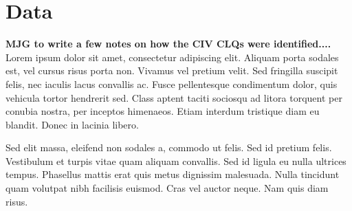 \documentclass[a4paper,fleqn,usenatbib]{mnras}
\begin{document}
\section{Data}
{\bf MJG to write a few notes on how the CIV CLQs were identified....}
 Lorem ipsum dolor sit amet, consectetur adipiscing elit. Aliquam
porta sodales est, vel cursus risus porta non. Vivamus vel pretium
velit. Sed fringilla suscipit felis, nec iaculis lacus convallis
ac. Fusce pellentesque condimentum dolor, quis vehicula tortor
hendrerit sed. Class aptent taciti sociosqu ad litora torquent per
conubia nostra, per inceptos himenaeos. Etiam interdum tristique diam
eu blandit. Donec in lacinia libero.

Sed elit massa, eleifend non sodales a, commodo ut felis. Sed id
pretium felis. Vestibulum et turpis vitae quam aliquam convallis. Sed
id ligula eu nulla ultrices tempus. Phasellus mattis erat quis metus
dignissim malesuada. Nulla tincidunt quam volutpat nibh facilisis
euismod. Cras vel auctor neque. Nam quis diam risus.
\end{document}
